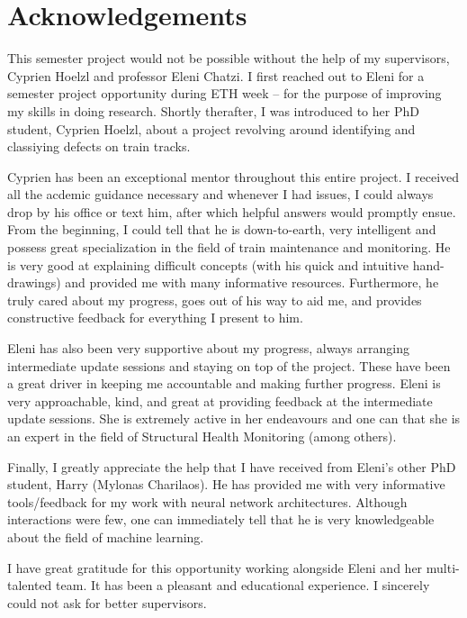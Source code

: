 \newpage
\chapter*{Acknowledgements}
This semester project would not be possible without the help of my supervisors, Cyprien Hoelzl and professor Eleni Chatzi. I first reached out to Eleni for a semester project opportunity during ETH week -- for the purpose of improving my skills in doing research. Shortly therafter, I was introduced to her PhD student, Cyprien Hoelzl, about a project revolving around identifying and classiying defects on train tracks.

Cyprien has been an exceptional mentor throughout this entire project. I received all the acdemic guidance necessary and whenever I had issues, I could always drop by his office or text him, after which helpful answers would promptly ensue. From the beginning, I could tell that he is down-to-earth, very intelligent and possess great specialization in the field of train maintenance and monitoring. He is very good at explaining difficult concepts (with his quick and intuitive hand-drawings) and provided me with many informative resources. Furthermore, he truly cared about my progress, goes out of his way to aid me, and provides constructive feedback for everything I present to him. 

Eleni has also been very supportive about my progress, always arranging intermediate update sessions and staying on top of the project. These have been a great driver in keeping me accountable and making further progress. Eleni is very approachable, kind, and great at providing feedback at the intermediate update sessions. She is extremely active in her endeavours and one can that she is an expert in the field of Structural Health Monitoring (among others).

Finally, I greatly appreciate the help that I have received from Eleni's other PhD student, Harry (Mylonas Charilaos). He has provided me with very informative tools/feedback for my work with neural network architectures. Although interactions were few, one can immediately tell that he is very knowledgeable about the field of machine learning.
 
I have great gratitude for this opportunity working alongside Eleni and her multi-talented team. It has been a pleasant and educational experience. I sincerely could not ask for better supervisors.


\newpage



